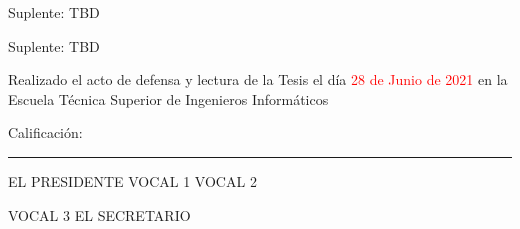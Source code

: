 \documentclass[twoside,11pt,table,xcdraw]{Latex/Classes/PhDthesisPSnPDF}
\begin{document}
\vspace{5mm}
Suplente: \hspace{1.5mm} TBD%

\vspace{5mm}
Suplente: \hspace{1.5mm} TBD%

\vspace{10mm}
\noindent Realizado el acto de defensa y lectura de la Tesis el d\'{i}a \textcolor{red}{28 de Junio de 2021} en la Escuela T\'ecnica Superior de Ingenieros Inform\'aticos

\vspace{5mm}
\noindent Calificaci\'{o}n: \rule{123mm}{0.2mm}
\vspace{20mm}

EL PRESIDENTE \hspace{30mm} VOCAL 1 \hspace{30mm} VOCAL 2

\vspace{30mm}
\hspace{15mm} VOCAL 3 \hspace{45mm} EL SECRETARIO





\cleardoublepage

\cleardoublepage




\cleardoublepage


%   


\cleardoublepage
\setcounter{secnumdepth}{3} %
\setcounter{tocdepth}{2}    %
\tableofcontents           %
\end{document}
